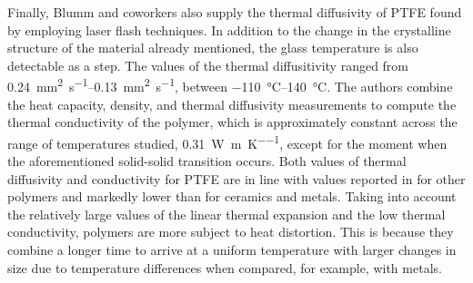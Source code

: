 Finally, Blumm and coworkers \citep{blummCharacterizationPTFEUsing2010} also supply the thermal diffusivity of PTFE found by employing laser flash techniques.
In addition to the change in the crystalline structure of the material already mentioned, the glass temperature is also detectable as a step.
The values of the thermal diffusitivity ranged from \SIrange{0.24}{0.13}{\milli\meter^2\per\second}, between \SIrange[range-phrase =\text{~and~}]{-110}{140}{\celsius}.
The authors combine the heat capacity, density, and thermal diffusivity measurements to compute the thermal conductivity of the polymer, which is approximately constant across the range of temperatures studied, \SI{0.31}{\watt\per\meter\per\kelvin}, except for the moment when the aforementioned solid-solid transition occurs.
Both values of thermal diffusivity and conductivity for PTFE are in line with values reported in \cite{ashbyMaterialsSelectionMechanical1999} for other polymers and markedly lower than for ceramics and metals.
Taking into account the relatively large values of the linear thermal expansion and the low thermal conductivity, polymers are more subject to heat distortion.
This is because they combine a longer time to arrive at a uniform temperature with larger changes in size due to temperature differences when compared, for example, with metals.
